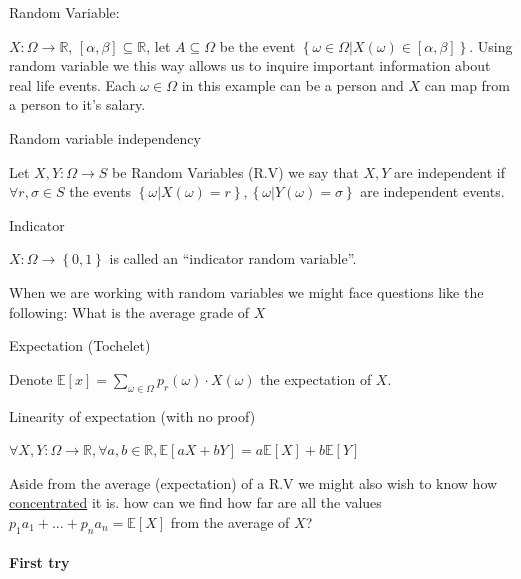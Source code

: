 \begin{example}
Random Variable: 

$X:\Omega\to\mathbb{R}$, $\left[\alpha,\beta\right]\subseteq\mathbb{R}$,
let $A\subseteq\Omega$ be the event $\left\{ \omega\in\Omega|X\left(\omega\right)\in\left[\alpha,\beta\right]\right\} $.
Using random variable we this way allows us to inquire important information
about real life events. Each $\omega\in\Omega$ in this example can
be a person and $X$ can map from a person to it's salary. 
\end{example}

\begin{definition}
Random variable independency 

Let $X,Y:\Omega\to S$ be Random Variables (R.V) we say that $X,Y$
are independent if $\forall r,\sigma\in S$ the events $\left\{ \omega|X\left(\omega\right)=r\right\} ,\left\{ \omega|Y\left(\omega\right)=\sigma\right\} $
are independent events.
\end{definition}

\begin{definition}
Indicator 

$X:\Omega\to\left\{ 0,1\right\} $ is called an ``indicator random
variable''.
\end{definition}

When we are working with random variables we might face questions
like the following: What is the average grade of $X$
\begin{definition}
Expectation (Tochelet)

Denote $\mathbb{E}\left[x\right]=\sum\limits _{\omega\in\Omega}p_{r}\left(\omega\right)\cdot X\left(\omega\right)$
the expectation of $X$.
\end{definition}

\begin{claim}
Linearity of expectation (with no proof)

$\forall X,Y:\Omega\to\mathbb{R},\forall a,b\in\mathbb{R},\mathbb{E}\left[aX+bY\right]=a\mathbb{E}\left[X\right]+b\mathbb{E}\left[Y\right]$
\end{claim}

Aside from the average (expectation) of a R.V we might also wish to
know how \uline{concentrated} it is. how can we find how far are
all the values $p_{1}a_{1}+\dots+p_{n}a_{n}=\mathbb{E}\left[X\right]$
from the average of $X$?

\paragraph*{First try}

